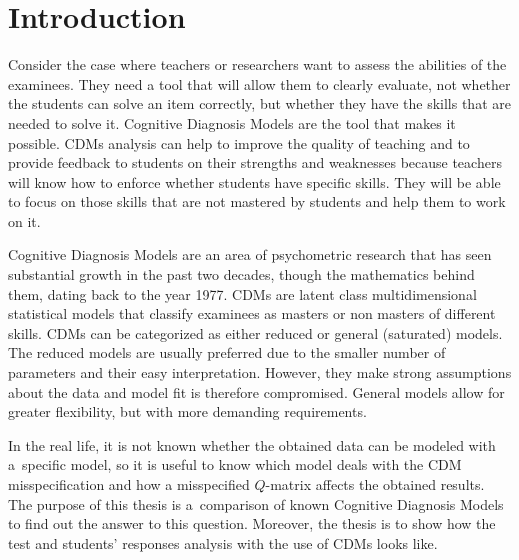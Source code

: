 \documentclass[english]{pwr_wmat_praca_dyplomowa}
\theoremstyle{plain}
\numberwithin{theorem}{chapter}
\theoremstyle{definition}
\numberwithin{theorem}{chapter}
\begin{document}
	\frontmatter
	\maketitle
	\mainmatter
	\tableofcontents
	{\backmatter \chapter{Introduction}}
	
	Consider the case where teachers or researchers want to assess the abilities of the examinees. They need a tool that will allow them to clearly evaluate, not whether the students can solve an item correctly, but whether they have the skills that are needed to solve it. Cognitive Diagnosis Models are the tool that makes it possible. CDMs analysis can help to improve the quality of teaching and to provide feedback to students on their strengths and weaknesses because teachers will know how to enforce whether students have specific skills. They will be able to focus on those skills that are not mastered by students and help them to work on it.
	
	Cognitive Diagnosis Models are an area of psychometric research that has seen substantial growth in the past two decades, though the mathematics behind them, dating back to the year 1977. CDMs are latent class multidimensional statistical models that classify examinees as masters or non masters of different skills. CDMs can be categorized as either reduced or general (saturated) models. The reduced models are usually preferred due to the smaller number of parameters and their easy interpretation. However, they make strong assumptions about the data and model fit is therefore compromised. General models allow for greater flexibility, but with more demanding requirements. 
	
	In the real life, it is not known whether the obtained data can be modeled with a~specific model, so it is useful to know which model deals with the CDM misspecification and how a misspecified $Q$-matrix affects the obtained results. The purpose of this thesis is a~comparison of known Cognitive Diagnosis Models to find out the answer to this question. Moreover, the thesis is to show how the test and students' responses analysis with the use of CDMs looks like. 
	
\end{document}
